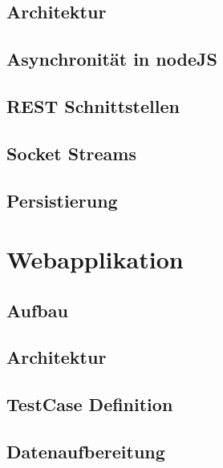 		\subsection{Architektur}
		\subsection{Asynchronität in nodeJS}
		\subsection{REST Schnittstellen}
		\subsection{Socket Streams}
		\subsection{Persistierung}
	\section{Webapplikation}
		\subsection{Aufbau}
		\subsection{Architektur}
		\subsection{TestCase Definition}
		\subsection{Datenaufbereitung}

